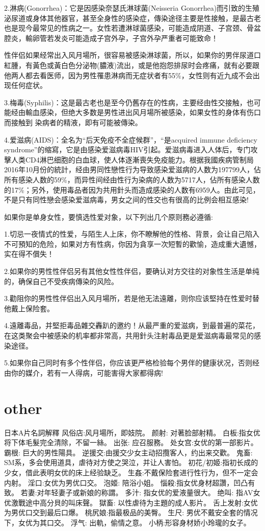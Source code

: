 \documentclass[12pt,UTF8]{ctexbook}
\begin{document}
2.淋病(Gonorrhea)：它是因感染奈瑟氏淋球菌(Neisseria Gonorrhea)而引致的生殖泌尿道或身体其他器官，甚至全身性的感染症，傳染途径主要是性接触，是最古老也是现今最常见的性病之一。女性若遭淋球菌感染，可能造成阴道、子宫颈、骨盆腔炎，輸卵管若发炎可能造成子宫外孕，子宫外孕严重者可能致命！

性伴侣如果经常出入风月場所，很容易被感染淋球菌，所以，如果你的男伴尿道口紅腫，有黃色或黃白色分泌物(膿液)流出，或是他抱怨排尿时会疼痛，就有必要跟他两人都去看医师，因为男性罹患淋病而无症状者有55\%，女性则有近九成不会出现任何症状。

3.梅毒(Syphilis)：这是最古老也是至今仍舊存在的性病，主要经由性交接触，也可能经由輸血感染，但绝大多数是男性进出风月場所被感染，如果女性的身体有伤口而接触到
染病者的精液，即有可能被傳染。

4.爱滋病(AIDS)：全名为“后天免疫不全症候群”，“是acquired immune deficiency syndrome”的缩寫，它是由感染爱滋病毒HIV引起。爱滋病毒进入人体后，专门攻擊人类CD4淋巴细胞的白血球，使人体逐漸喪失免疫能力。根据我國疾病管制局2016年10月份的統計，经由男同性戀性行为导致感染爱滋病的人数为197799人，佔所有感染人数的59\%，而异性间经由性行为染病的人数为5717人，佔所有感染人数的17\%；另外，使用毒品者因为共用針头而造成感染的人数有6959人。由此可见，不是只有同性戀会感染爱滋病毒，男女之间的性交也有很高的比例会相互感染!

如果你是单身女性，要慎选性爱对象，以下列出几个原则務必遵循:

1.切忌一夜情式的性爱，与陌生人上床，你不瞭解他的性格、背景，会让自己陷入不可預知的危险，如果对方有性病，你因为貪享一次短暫的歡愉，造成重大遺憾，实在得不償失！

2.如果你的男性性伴侣另有其他女性性伴侣，要确认对方交往的对象性生活是单纯的，确保自己不受疾病傳染的风险。

3.勸阻你的男性性伴侣出入风月場所，若是他无法遠離，则你应该堅持在性爱时替他戴上保险套。

4.遠離毒品，并堅拒毒品雜交轟趴的邀约！从最严重的爱滋病，到最普遍的菜花，在这类聚会中被感染的机率都非常高，共用針头注射毒品更是爱滋病毒最常见的感染途径。

5.如果你自己同时有多个性伴侣，你应该更严格检验每个男伴的健康状况，否则经由你的媒介，若有一人得病，可能害得大家都得病!

\part{other}

日本A片名詞解釋
风俗店:风月場所，即妓院。
颜射: 对著脸部射精。
白板:指女优将下体毛髮完全清除，不留一絲。
出张: 应召服務。
处女宫:女优的第一部影片。
霸根: 巨大的男性陽具。
逆援交:由援交少女主动招攬客人，约出来交歡。
鬼畜: SM系，多会使用道具，虐待对方使之哭泣，并让人害怕。
初花/初姬:指初长成的少女，借此表明女优的床上经验缺乏。
生姦:不戴保险套进行性行为，但不一定会内射。
淫口:女优为男优口交。
泡姬: 陪浴小姐。
惱殺:指女优身材超讚，凹凸有致。
若妻:对年轻妻子或新娘的称謂。
多汁: 指女优的爱液量很大。
绝叫: 指AV女优激戰途中高分貝的叫床聲。
獄畜: 以性虐待为主題的成人影片。
舌上发射:女优为男优口交到最后口爆。
桃尻娘:指最极品的美臀。
生尺: 男优不戴安全套的情况下，女优为其口交。
浮气: 出軌，偷情之意。
小柄:形容身材娇小玲瓏的女子。
\end{document}
